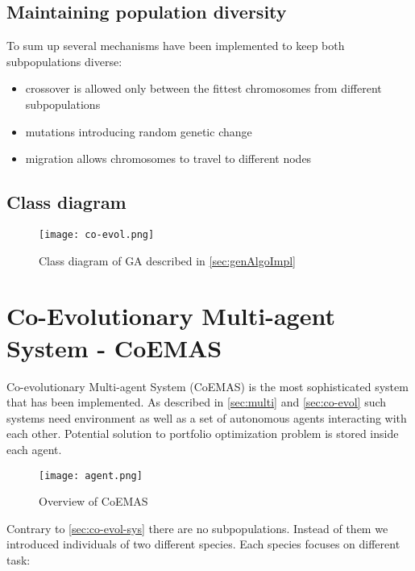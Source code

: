 \subsection{Maintaining population diversity}

To sum up several mechanisms have been implemented to keep both subpopulations diverse:

\begin{itemize}
  \item crossover is allowed only between the fittest chromosomes from different subpopulations 
  \item mutations introducing random genetic change
  \item migration allows chromosomes to travel to different nodes  
\end{itemize}

\subsection{Class diagram}
\label{Co-evol-class-diagram}

\begin{figure}[ht]   
	    \begin{center}
	      \texttt{[image: co-evol.png]}
	    \end{center}
	    \caption{Class diagram of GA described in \ref{sec:genAlgoImpl}} 
	  \end{figure}


\section{Co-Evolutionary Multi-agent System - CoEMAS}

Co-evolutionary Multi-agent System (CoEMAS) is the most sophisticated system that has been implemented.
As described in \ref{sec:multi} and \ref{sec:co-evol} such systems need environment as well as a set of autonomous agents interacting with each other.
Potential solution to portfolio optimization problem is stored inside each agent.


\begin{figure}[ht]   
	    \begin{center}
	      \texttt{[image: agent.png]}
	    \end{center}
	    \caption{Overview of CoEMAS} 
	  \end{figure}

Contrary to \ref{sec:co-evol-sys} there are no subpopulations.
Instead of them we introduced individuals of two different species.
Each species focuses on different task:

